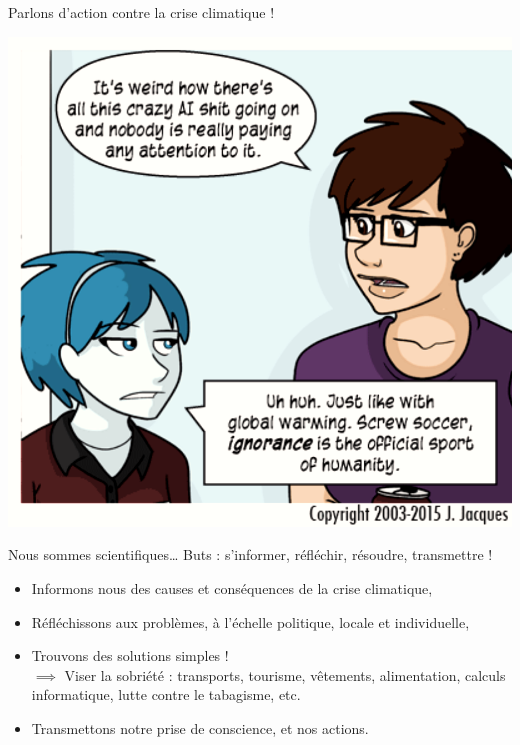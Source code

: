 \documentclass[11pt,french,ignorenonframetext,]{beamer}
\begin{document}
\begin{frame}[plain]{Parlons d'action contre la crise climatique !}

  \begin{center}
    \includegraphics[height=0.30\textheight]{../common/TalkAboutGlobalWarmingNow.png}
  \end{center}

  \begin{alertblock}{Nous sommes scientifiques\ldots}
    Buts : \alert{s'informer, réfléchir, résoudre, transmettre} !
    \begin{itemize}
      \item \alert{Informons nous} des \alert{causes} et \alert{conséquences} de la crise climatique,
      \item \alert{Réfléchissons} aux problèmes, à l'échelle politique, locale et individuelle,
      \item \alert{Trouvons} des solutions simples !\\
        $\implies$ Viser la sobriété : transports, tourisme, vêtements, alimentation, calculs informatique, lutte contre le tabagisme, etc.
      \item \alert{Transmettons} notre prise de conscience, et nos actions.
    \end{itemize}
  \end{alertblock}

\end{frame}
\end{document}
